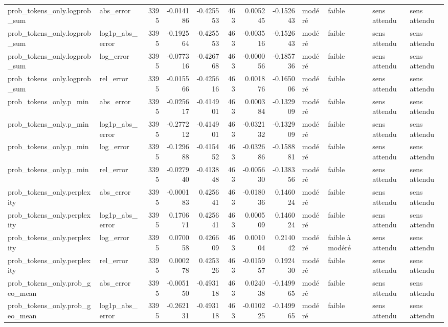 \begin{longtable}{llrrrrrrllll}
prob_tokens_only.logprob_sum & abs_error & 3395 & -0.014186 & -0.425553 & 463 & 0.005245 & -0.152643 & modéré & faible & sens attendu & sens attendu \\
prob_tokens_only.logprob_sum & log1p_abs_error & 3395 & -0.192564 & -0.425553 & 463 & -0.003516 & -0.152643 & modéré & faible & sens attendu & sens attendu \\
prob_tokens_only.logprob_sum & log_error & 3395 & -0.077316 & -0.426768 & 463 & -0.000056 & -0.185736 & modéré & faible & sens attendu & sens attendu \\
prob_tokens_only.logprob_sum & rel_error & 3395 & -0.015566 & -0.425616 & 463 & 0.001876 & -0.165006 & modéré & faible & sens attendu & sens attendu \\
prob_tokens_only.p_min & abs_error & 3395 & -0.025617 & -0.414901 & 463 & 0.000384 & -0.132909 & modéré & faible & sens attendu & sens attendu \\
prob_tokens_only.p_min & log1p_abs_error & 3395 & -0.277212 & -0.414901 & 463 & -0.032132 & -0.132909 & modéré & faible & sens attendu & sens attendu \\
prob_tokens_only.p_min & log_error & 3395 & -0.129688 & -0.415452 & 463 & -0.032686 & -0.158881 & modéré & faible & sens attendu & sens attendu \\
prob_tokens_only.p_min & rel_error & 3395 & -0.027940 & -0.413848 & 463 & -0.005630 & -0.138356 & modéré & faible & sens attendu & sens attendu \\
prob_tokens_only.perplexity & abs_error & 3395 & -0.000183 & 0.425641 & 463 & -0.018036 & 0.146024 & modéré & faible & sens attendu & sens attendu \\
prob_tokens_only.perplexity & log1p_abs_error & 3395 & 0.170671 & 0.425641 & 463 & 0.000509 & 0.146024 & modéré & faible & sens attendu & sens attendu \\
prob_tokens_only.perplexity & log_error & 3395 & 0.070058 & 0.426609 & 463 & 0.001004 & 0.214042 & modéré & faible à modéré & sens attendu & sens attendu \\
prob_tokens_only.perplexity & rel_error & 3395 & 0.000278 & 0.425326 & 463 & -0.015957 & 0.192430 & modéré & faible & sens attendu & sens attendu \\
prob_tokens_only.prob_geo_mean & abs_error & 3395 & -0.005150 & -0.493118 & 463 & 0.024038 & -0.149965 & modéré & faible & sens attendu & sens attendu \\
prob_tokens_only.prob_geo_mean & log1p_abs_error & 3395 & -0.262131 & -0.493118 & 463 & -0.010225 & -0.149965 & modéré & faible & sens attendu & sens attendu \\

\end{longtable}
